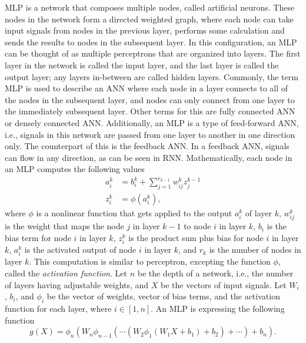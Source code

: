 \gls{MLP} is a network that composes multiple nodes, called artificial neurons.
These nodes in the network form a directed weighted graph, where each node can take input signals from nodes in the previous layer, performs some calculation and sends the results to nodes in the subsequent layer.
In this configuration, an \gls{MLP} can be thought of as multiple perceptrons that are organized into layers.
The first layer in the network is called the input layer, and the last layer is called the output layer; any layers in-between are called hidden layers.
Commonly, the term \gls{MLP} is used to describe an \gls{ANN} where each node in a layer connects to all of the nodes in the subsequent layer, and nodes can only connect from one layer to the immediately subsequent layer.
Other terms for this are fully connected \gls{ANN} or densely connected \gls{ANN}.
Additionally, an \gls{MLP} is a type of feed-forward \gls{ANN}, i.e., signals in this network are passed from one layer to another in one direction only.
The counterpart of this is the feedback \gls{ANN}.
In a feedback \gls{ANN}, signals can flow in any direction, as can be seen in \gls{RNN}.
Mathematically, each node in an \gls{MLP} computes the following values
\begin{equation}
    \begin{aligned}
        a_i^k &= b_i^k + \sum_{j=1}^{r_{k-1}} w_{ij}^k z_j^{k-1} \\
        z_i^k &= \phi (a_i^k),
    \end{aligned}
\end{equation}
where $\phi$ is a nonlinear function that gets applied to the output $a_i^k$ of layer $k$, $w_{ij}^k$ is the weight that maps the node $j$ in layer $k - 1$ to node $i$ in layer $k$, $b_i$ is the bias term for node $i$ in layer $k$, $z_i^k$ is the product sum plus bias for node $i$ in layer $k$, $a_i^k$ is the activated output of node $i$ in layer $k$, and $r_k$ is the number of nodes in layer $k$.
This computation is similar to perceptron, excepting the function $\phi$, called the \textit{activation function}.
Let $n$ be the depth of a network, i.e., the number of layers having adjustable weights, and $X$ be the vectors of input signals.
Let $W_i$, $b_i$, and $\phi_i$ be the vector of weights, vector of bias terms, and the activation function for each layer, where $i \in [1, n]$.
An \gls{MLP} is expressing the following function
\begin{equation}
    g(X) = \phi_n(W_n \phi_{n - 1}(\cdots (W_2 \phi_1(W_1 X + b_1) + b_2) + \cdots) + b_n).
\end{equation}

